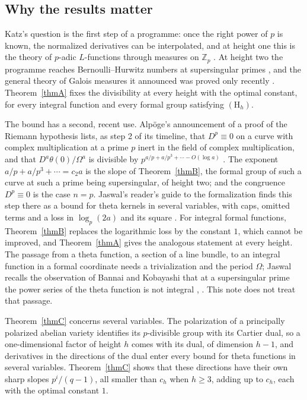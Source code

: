 \documentclass[11pt]{amsart}
\theoremstyle{definition}
\theoremstyle{remark}
\newcommand{\Z}{\mathbb Z}
\begin{document}
\subsection{Why the results matter}\label{sec:why}
Katz's question is the first step of a programme: once the right power of $p$ is known, the normalized derivatives can be interpolated, and at height one this is the theory of $p$-adic $L$-functions through measures on $\Z_p$ \cite[\S\S III--V]{Katz77}. At height two the programme reaches Bernoulli--Hurwitz numbers at supersingular primes \cite{Katz81,Chellali90,BK16}, and the general theory of Galois measures it announced was proved only recently \cite{Berger25}. Theorem~\ref{thmA} fixes the divisibility at every height with the optimal constant, for every integral function and every formal group satisfying $(\mathrm H_h)$.

The bound has a second, recent use. Alp\"oge's announcement of a proof of the Riemann hypothesis lists, as step 2 of its timeline, that $D^p\equiv0$ on a curve with complex multiplication at a prime $p$ inert in the field of complex multiplication, and that $D^a\theta(0)/\Omega^a$ is divisible by $p^{a/p+a/p^3+\cdots-O(\log a)}$ \cite[p.~3]{Alpoge}. The exponent $a/p+a/p^3+\cdots=c_2a$ is the slope of Theorem~\ref{thmB}, the formal group of such a curve at such a prime being supersingular, of height two; and the congruence $D^p\equiv0$ is the case $n=p$. Jaswal's reader's guide to the formalization finds this step there as a bound for theta kernels in several variables, with caps, omitted terms and a loss in $\log_p(2a)$ and its square \cite[\S4.4, pp.~28--30]{Jaswal}. For integral formal functions, Theorem~\ref{thmB} replaces the logarithmic loss by the constant $1$, which cannot be improved, and Theorem~\ref{thmA} gives the analogous statement at every height. The passage from a theta function, a section of a line bundle, to an integral function in a formal coordinate needs a trivialization and the period $\Omega$; Jaswal recalls the observation of Bannai and Kobayashi that at a supersingular prime the power series of the theta function is not integral \cite[p.~30]{Jaswal}, \cite[\S4]{BK10}. This note does not treat that passage.

Theorem~\ref{thmC} concerns several variables. The polarization of a principally polarized abelian variety identifies its $p$-divisible group with its Cartier dual, so a one-dimensional factor of height $h$ comes with its dual, of dimension $h-1$, and derivatives in the directions of the dual enter every bound for theta functions in several variables. Theorem~\ref{thmC} shows that these directions have their own sharp slopes $p^i/(q-1)$, all smaller than $c_h$ when $h\ge3$, adding up to $c_h$, each with the optimal constant $1$.
\end{document}
